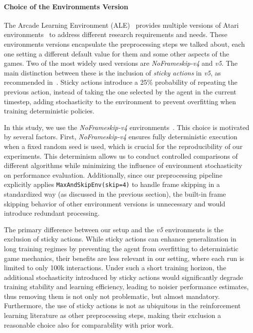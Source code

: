 \paragraph{Choice of the Environments Version}
The Arcade Learning Environment (ALE)~\cite{bellemare:ale} provides multiple versions of Atari environments~\cite{farama:ale} to address different research requirements and needs. These environments versions encapsulate the preprocessing steps we talked about, each one setting a different default value for them and some other aspects of the games. Two of the most widely used versions are \textit{NoFrameskip-v4} and \textit{v5}. The main distinction between these is the inclusion of \textit{sticky actions} in \textit{v5}, as recommended in~\cite{machado:revisiting_ale}. Sticky actions introduce a 25\% probability of repeating the previous action, instead of taking the one selected by the agent in the current timestep, adding stochasticity to the environment to prevent overfitting when training deterministic policies. 

In this study, we use the \textit{NoFrameskip-v4} environments~\cite{farama:ale}. This choice is motivated by several factors. First, \textit{NoFrameskip-v4} ensures fully deterministic execution when a fixed random seed is used, which is crucial for the reproducibility of our experiments. This determinism allows us to conduct controlled comparisons of different algorithms while minimizing the influence of environment stochasticity on performance evaluation. Additionally, since our preprocessing pipeline explicitly applies \verb|MaxAndSkipEnv(skip=4)| to handle frame skipping in a standardized way (as discussed in the previous section), the built-in frame skipping behavior of other environment versions is unnecessary and would introduce redundant processing.

The primary difference between our setup and the \textit{v5} environments is the exclusion of sticky actions. While sticky actions can enhance generalization in long training regimes by preventing the agent from overfitting to deterministic game mechanics, their benefits are less relevant in our setting, where each run is limited to only 100k interactions. Under such a short training horizon, the additional stochasticity introduced by sticky actions would significantly degrade training stability and learning efficiency, leading to noisier performance estimates, thus removing them is not only not problematic, but almost mandatory. Furthermore, the use of sticky actions is not as ubiquitous in the reinforcement learning literature as other preprocessing steps, making their exclusion a reasonable choice also for comparability with prior work.

